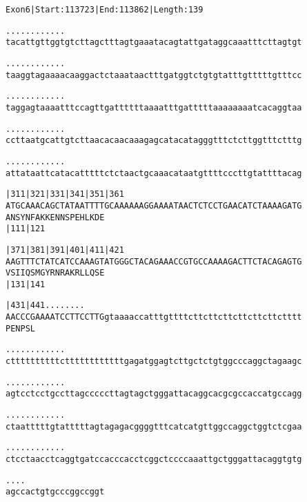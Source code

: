 \documentclass{article}
\begin{document}
\begin{alltt}
Exon 6 | Start: 113723 | End: 113862 | Length: 139

.    .    .    .    .    .    .    .    .    .    .    .    
tacattgttggtgtcttagctttagtgaaatacagtattgataggcaaatttcttagtgt

.    .    .    .    .    .    .    .    .    .    .    .    
taaggtagaaaacaaggactctaaataactttgatggtctgtgtatttgtttttgtttcc

.    .    .    .    .    .    .    .    .    .    .    .    
taggagtaaaatttccagttgattttttaaaatttgatttttaaaaaaaatcacaggtaa

.    .    .    .    .    .    .    .    .    .    .    .    
ccttaatgcattgtcttaacacaacaaagagcatacatagggtttctcttggtttctttg

.    .    .    .    .    .    .    .    .    .    .    .    
attataattcatacatttttctctaactgcaaacataatgttttcccttgtattttacag

         |311      |321      |331      |341      |351      |361
ATGCAAACAGCTATAATTTTGCAAAAAAGGAAAATAACTCTCCTGAACATCTAAAAGATG
  A  N  S  Y  N  F  A  K  K  E  N  N  S  P  E  H  L  K  D  E
                             |111                          |121

         |371      |381      |391      |401      |411      |421
AAGTTTCTATCATCCAAAGTATGGGCTACAGAAACCGTGCCAAAAGACTTCTACAGAGTG
  V  S  I  I  Q  S  M  G  Y  R  N  R  A  K  R  L  L  Q  S  E
                             |131                          |141

         |431      |441 .    .    .    .    .    .    .    .
AACCCGAAAATCCTTCCTTGgtaaaaccatttgttttcttcttcttcttcttcttctttt
  P  E  N  P  S  L                                          

    .    .    .    .    .    .    .    .    .    .    .    .
cttttttttttcttttttttttttgagatggagtcttgctctgtggcccaggctagaagc

    .    .    .    .    .    .    .    .    .    .    .    .
agtcctcctgccttagcccccttagtagctgggattacaggcacgcgccaccatgccagg

    .    .    .    .    .    .    .    .    .    .    .    .
ctaatttttgtatttttagtagagacggggtttcatcatgttggccaggctggtctcgaa

    .    .    .    .    .    .    .    .    .    .    .    .
ctcctaacctcaggtgatccacccacctcggctccccaaattgctgggattacaggtgtg

    .    .    .    .
agccactgtgcccggccggt
\end{alltt}
\newpage
\end{document}
